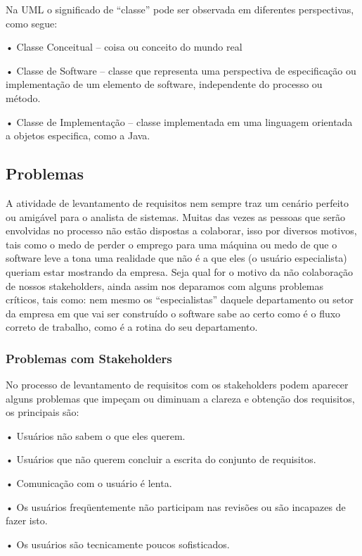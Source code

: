 Na UML o significado de “classe” pode ser observada em diferentes
perspectivas, como segue:

• Classe Conceitual – coisa ou conceito do mundo real

• Classe de Software – classe que representa uma perspectiva de
especificação ou implementação de um elemento de software, independente
do processo ou método.

• Classe de Implementação – classe implementada em uma linguagem
orientada a objetos especifica, como a Java.

\subsection{Problemas}
\label{subsec:problemas}

A atividade de levantamento de requisitos nem sempre traz um cenário
perfeito ou amigável para o analista de sistemas. Muitas das vezes as pessoas que
serão envolvidas no processo não estão dispostas a colaborar, isso por diversos
motivos, tais como o medo de perder o emprego para uma máquina ou medo de que
o software leve a tona uma realidade que não é a que eles (o usuário especialista)
queriam estar mostrando da empresa. Seja qual for o motivo da não colaboração de
nossos stakeholders, ainda assim nos deparamos com alguns problemas críticos,
tais como: nem mesmo os “especialistas” daquele departamento ou setor da
empresa em que vai ser construído o software sabe ao certo como é o fluxo correto
de trabalho, como é a rotina do seu departamento.

\subsubsection{Problemas com Stakeholders}
\label{subsec:problemasStakeholders}

No processo de levantamento de requisitos com os stakeholders podem
aparecer alguns problemas que impeçam ou diminuam a clareza e obtenção dos
requisitos, os principais são:

• Usuários não sabem o que eles querem.

• Usuários que não querem concluir a escrita do conjunto de requisitos.

• Comunicação com o usuário é lenta.

• Os usuários freqüentemente não participam nas revisões ou são
incapazes de fazer isto.

• Os usuários são tecnicamente poucos sofisticados.

